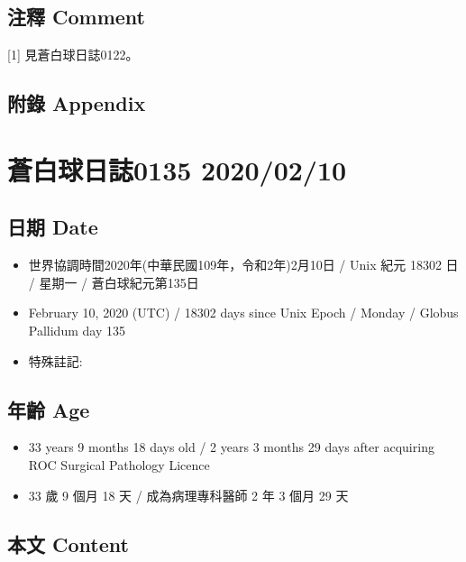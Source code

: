 \documentclass[
]{article}
\providecommand{\tightlist}{%
  \setlength{\itemsep}{0pt}\setlength{\parskip}{0pt}}
\begin{document}
\hypertarget{ux6ce8ux91cb-comment-8}{%
\subsection{注釋 Comment}\label{ux6ce8ux91cb-comment-8}}

{[}1{]} 見蒼白球日誌0122。

\hypertarget{ux9644ux9304-appendix-8}{%
\subsection{附錄 Appendix}\label{ux9644ux9304-appendix-8}}

\hypertarget{ux84bcux767dux7403ux65e5ux8a8c0135-20200210}{%
\section{蒼白球日誌0135
2020/02/10}\label{ux84bcux767dux7403ux65e5ux8a8c0135-20200210}}

\hypertarget{ux65e5ux671f-date-9}{%
\subsection{日期 Date}\label{ux65e5ux671f-date-9}}

\begin{itemize}
\tightlist
\item
  世界協調時間2020年(中華民國109年，令和2年)2月10日 / Unix 紀元 18302 日
  / 星期一 / 蒼白球紀元第135日
\item
  February 10, 2020 (UTC) / 18302 days since Unix Epoch / Monday /
  Globus Pallidum day 135
\item
  特殊註記:
\end{itemize}

\hypertarget{ux5e74ux9f61-age-9}{%
\subsection{年齡 Age}\label{ux5e74ux9f61-age-9}}

\begin{itemize}
\tightlist
\item
  33 years 9 months 18 days old / 2 years 3 months 29 days after
  acquiring ROC Surgical Pathology Licence
\item
  33 歲 9 個月 18 天 / 成為病理專科醫師 2 年 3 個月 29 天
\end{itemize}

\hypertarget{ux672cux6587-content-9}{%
\subsection{本文 Content}\label{ux672cux6587-content-9}}
\end{document}
